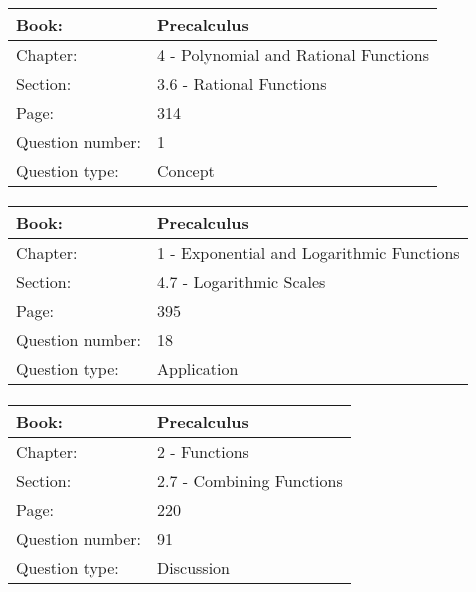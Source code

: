 \documentclass{article}
\begin{document}
   \paragraph{}
   \begin{tabularx}{1\textwidth}{
           p{}
           p{}
       }
       \toprule
       Book: & Precalculus
       \\
       \midrule
       Chapter: & 4 - Polynomial and Rational Functions
       \\
       \midrule
       Section: & 3.6 - Rational Functions
       \\
       \midrule
       Page: & 314
       \\
       \midrule
       Question number: & 1
       \\
       \midrule
       Question type: & Concept
       \\
       \bottomrule
   \end{tabularx}



   \paragraph{}
   \begin{tabularx}{1\textwidth}{
           p{}
           p{}
       }
       \toprule
       Book: & Precalculus
       \\
       \midrule
       Chapter: & 1 - Exponential and Logarithmic Functions
       \\
       \midrule
       Section: & 4.7 - Logarithmic Scales
       \\
       \midrule
       Page: & 395
       \\
       \midrule
       Question number: & 18
       \\
       \midrule
       Question type: & Application
       \\
       \bottomrule
   \end{tabularx}



   \paragraph{}
   \begin{tabularx}{1\textwidth}{
           p{}
           p{}
       }
       \toprule
       Book: & Precalculus
       \\
       \midrule
       Chapter: & 2 - Functions
       \\
       \midrule
       Section: & 2.7 - Combining Functions
       \\
       \midrule
       Page: & 220
       \\
       \midrule
       Question number: & 91
       \\
       \midrule
       Question type: & Discussion
       \\
       \bottomrule
   \end{tabularx}
\end{document}
